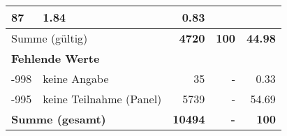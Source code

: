 \begin{longtable}{lXrrr}
       \num{87} &
       \num[round-mode=places,round-precision=2]{1,84} &
         \num[round-mode=places,round-precision=2]{0,83} \\
     \midrule
     \multicolumn{2}{l}{Summe (gültig)} &
       \textbf{\num{4720}} &
     \textbf{100} &
       \textbf{\num[round-mode=places,round-precision=2]{44,98}} \\
     \multicolumn{5}{l}{\textbf{Fehlende Werte}}\\
       -998 &
       keine Angabe &
         \num{35} &
        - &
         \num[round-mode=places,round-precision=2]{0,33} \\
       -995 &
       keine Teilnahme (Panel) &
         \num{5739} &
        - &
         \num[round-mode=places,round-precision=2]{54,69} \\
     \midrule
     \multicolumn{2}{l}{\textbf{Summe (gesamt)}} &
          \textbf{\num{10494}} &
        \textbf{-} &
        \textbf{100} \\
     \bottomrule
     \end{longtable}
     
